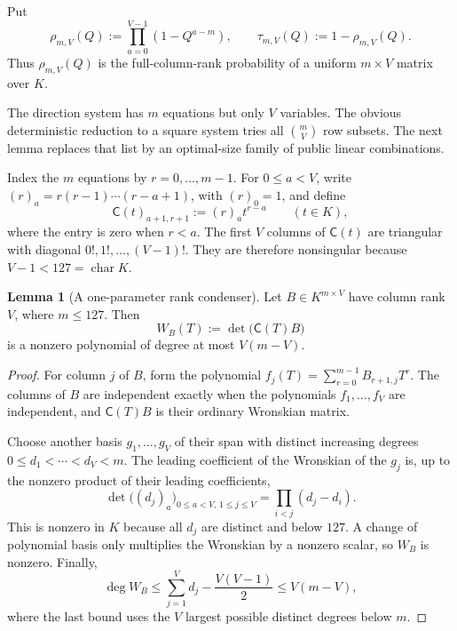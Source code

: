 \documentclass[11pt,a4paper]{article}
\theoremstyle{definition}
\newtheorem{lemma}[theorem]{Lemma}
\theoremstyle{remark}
\begin{document}
Put
\begin{equation}\label{eq:rho-mv}
 \rho_{m,V}(Q):=\prod_{a=0}^{V-1}(1-Q^{a-m}),
 \qquad
 \tau_{m,V}(Q):=1-\rho_{m,V}(Q).
\end{equation}
Thus $\rho_{m,V}(Q)$ is the full-column-rank probability of a uniform $m\times V$ matrix over $K$.

The direction system has $m$ equations but only $V$ variables.  The obvious deterministic reduction to a square system tries all $\binom mV$ row subsets.  The next lemma replaces that list by an optimal-size family of public linear combinations.

Index the $m$ equations by $r=0,\ldots,m-1$.  For $0\le a<V$, write
$(r)_a=r(r-1)\cdots(r-a+1)$, with $(r)_0=1$, and define
\begin{equation}\label{eq:wronskian-condenser}
 \mathsf C(t)_{a+1,r+1}:=(r)_a t^{r-a}
 \qquad(t\in K),
\end{equation}
where the entry is zero when $r<a$.  The first $V$ columns of $\mathsf C(t)$ are triangular with diagonal $0!,1!,\ldots,(V-1)!$.  They are therefore nonsingular because $V-1<127=\operatorname{char}K$.

\begin{lemma}[A one-parameter rank condenser]\label{lem:wronskian-condenser}
Let $B\in K^{m\times V}$ have column rank $V$, where $m\le127$.  Then
\begin{equation}\label{eq:wronskian-polynomial}
 W_B(T):=\det\bigl(\mathsf C(T)B\bigr)
\end{equation}
is a nonzero polynomial of degree at most $V(m-V)$.
\end{lemma}

\begin{proof}
For column $j$ of $B$, form the polynomial
$f_j(T)=\sum_{r=0}^{m-1}B_{r+1,j}T^r$.  The columns of $B$ are independent exactly when the polynomials $f_1,\ldots,f_V$ are independent, and $\mathsf C(T)B$ is their ordinary Wronskian matrix.

Choose another basis $g_1,\ldots,g_V$ of their span with distinct increasing degrees
$0\le d_1<\cdots<d_V<m$.  The leading coefficient of the Wronskian of the $g_j$ is, up to the nonzero product of their leading coefficients,
\[
 \det\bigl((d_j)_a\bigr)_{0\le a<V,\,1\le j\le V}
 =\prod_{i<j}(d_j-d_i).
\]
This is nonzero in $K$ because all $d_j$ are distinct and below $127$.  A change of polynomial basis only multiplies the Wronskian by a nonzero scalar, so $W_B$ is nonzero.  Finally,
\[
 \deg W_B
 \le \sum_{j=1}^V d_j-\frac{V(V-1)}2
 \le V(m-V),
\]
where the last bound uses the $V$ largest possible distinct degrees below $m$.
\end{proof}
\end{document}
